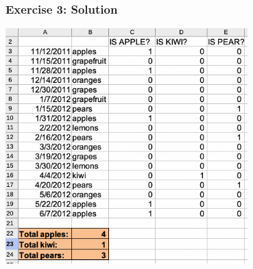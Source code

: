 \documentclass[12pt]{beamer}
\begin{document}
	\begin{frame}
		\frametitle{Exercise 3: Solution}
		\begin{center}
			\includegraphics[width=0.7\textwidth]{Exercise3Soln.png}
		\end{center}
	\end{frame}
\end{document}
